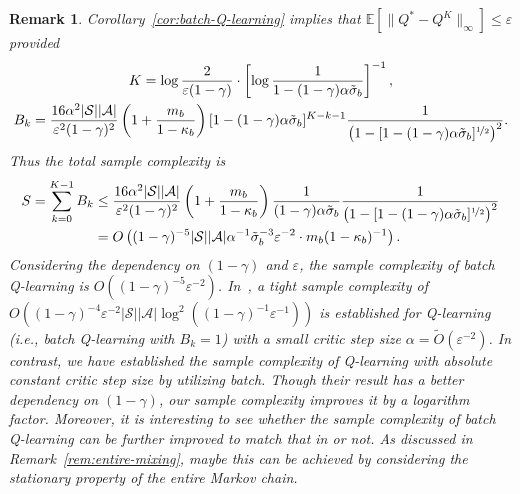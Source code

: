 \documentclass[10pt]{article}
\newcommand{\calA}{\mathcal{A}}
\newcommand{\calS}{\mathcal{S}}
\newcommand{\E}{\mathbb{E}}
\newcommand{\ls}{\left}
\newcommand{\rs}{\right}
\theoremstyle{plain}
\newtheorem{remark}{Remark}[section]
\theoremstyle{definition}
\begin{document}
\begin{remark}
    Corollary~\ref{cor:batch-Q-learning} implies that $\E[\| Q^* - Q^K \|_\infty] \leq \varepsilon$ provided
    \begin{gather*}
        K = \log \frac{2}{\varepsilon(1-\gamma)} \cdot \ls[ \log \frac{1}{1-(1-\gamma)\alpha\tilde\sigma_b} \rs]^{-1}, \\ %
        B_k = \frac{16\alpha^2|\calS||\calA|}{\varepsilon^{2}(1-\gamma)^2} \ls( 1 + \frac{m_b}{1-\kappa_b} \rs) [1-(1-\gamma)\alpha\tilde\sigma_b]^{K-k-1} \frac{1}{\ls(1-[1-(1-\gamma)\alpha\tilde\sigma_b]^{\nicefrac{1}{2}}\rs)^2}.
    \end{gather*}
    Thus the total sample complexity is
    \begin{align*}
        S = \sum_{k=0}^{K-1} B_k &\leq \frac{16\alpha^2|\calS||\calA|}{\varepsilon^{2}(1-\gamma)^2} \ls( 1 + \frac{m_b}{1-\kappa_b} \rs) \frac{1}{(1-\gamma)\alpha\tilde\sigma_b} \frac{1}{\ls(1-[1-(1-\gamma)\alpha\tilde\sigma_b]^{\nicefrac{1}{2}}\rs)^2} \\
        &= O \ls( (1-\gamma)^{-5} |\calS||\calA| \alpha^{-1} \tilde\sigma_b^{-3} \varepsilon^{-2} \cdot m_b (1-\kappa_b)^{-1} \rs).
    \end{align*}
    Considering the dependency on $(1-\gamma)$ and $\varepsilon$, the sample complexity of batch Q-learning is $O((1-\gamma)^{-5} \varepsilon^{-2})$. In~\textup{\citet{Li2021IsQM}}, a tight sample complexity of $O((1-\gamma)^{-4}\varepsilon^{-2}|\mathcal{S}||\mathcal{A}| \log^2 ((1-\gamma)^{-1}\varepsilon^{-1}))$ is established for Q-learning \textup{(}i.e., batch Q-learning with $B_k=1$\textup{)} with a small critic step size $\alpha=\tilde{O}(\varepsilon^{-2})$. In contrast, we have established the sample complexity of Q-learning with absolute constant critic step size by utilizing batch.  Though their result has a better dependency on $(1-\gamma)$, our sample complexity improves it by a logarithm  factor. Moreover, it is interesting to see whether the sample complexity of batch Q-learning can be further improved to match that in  \textup{\citet{Li2021IsQM}} or not. As discussed in Remark~\ref{rem:entire-mixing}, maybe this can be achieved by considering the stationary property of the entire Markov chain.
\end{remark}

\end{document}
